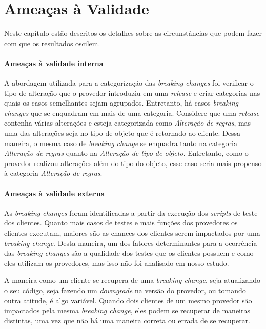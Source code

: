 \chapter{Ameaças à Validade}
\label{cap:threats}
Neste capítulo estão descritos os detalhes sobre as circunstâncias que podem fazer com que os resultados oscilem.

\subsubsection{Ameaças à validade interna}
A abordagem utilizada para a categorização das \textit{breaking changes} foi verificar o tipo de alteração que o provedor introduziu em uma \textit{release} e criar categorias nas quais os casos semelhantes sejam agrupados. Entretanto, há casos \textit{breaking changes} que se enquadram em mais de uma categoria. Considere que uma \textit{release} contenha várias alterações e esteja categorizada como \textit{Alteração de regras}, mas uma das alterações seja no tipo de objeto que é retornado ao cliente. Dessa maneira, o mesma caso de \textit{breaking change} se enquadra tanto na categoria \textit{Alteração de regras} quanto na \textit{Alteração de tipo de objeto}. Entretanto, como o provedor realizou alterações além do tipo do objeto, esse caso seria mais propenso à categoria \textit{Alteração de regras}.

\subsubsection{Ameaças à validade externa}
As \textit{breaking changes} foram identificadas a partir da execução dos \textit{scripts} de teste dos clientes. Quanto mais casos de testes e mais funções dos provedores os clientes executam, maiores são as chances dos clientes serem impactados por uma \textit{breaking change}. Desta maneira, um dos fatores determinantes para a ocorrência das \textit{breaking changes} são a qualidade dos testes que os clientes possuem e como eles utilizam os provedores, mas isso não foi analisado em nosso estudo.

A maneira como um cliente se recupera de uma \textit{breaking change}, seja atualizando o seu código, seja fazendo um \textit{downgrade} na versão do provedor, ou tomando outra atitude, é algo variável. Quando dois clientes de um mesmo provedor são impactados pela mesma \textit{breaking change}, eles podem se recuperar de maneiras distintas, uma vez que não há uma maneira correta ou errada de se recuperar.

